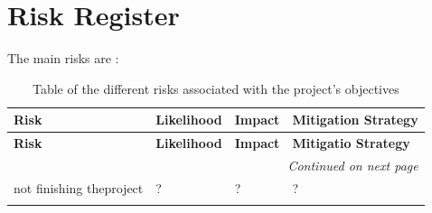 \documentclass[11pt]{article}
\begin{document}
\section{Risk Register}
The main risks are : 

\begin{longtable}{|p{3.5cm}|p{2.5cm}|p{4.5cm}|p{5cm}|}
    \hline
    \textbf{Risk} & \textbf{Likelihood} & \textbf{Impact} & \textbf{Mitigation Strategy}\\
    \hline
    \endfirsthead
    \hline
    \textbf{Risk} & \textbf{Likelihood} & \textbf{Impact} & \textbf{Mitigatio Strategy}\\
    \hline
    \endhead
    \hline
    \multicolumn{4}{|r|}{\textit{Continued on next page}} \\
    \hline
    \endfoot
    \hline
\endlastfoot
        \hline
        not finishing the\newline project & ? & ? & ? \\ \hline 
    \caption{Table of the different risks associated with the project's objectives}
    \label{tbl:hyperparams}
\end{longtable}
\end{document}
